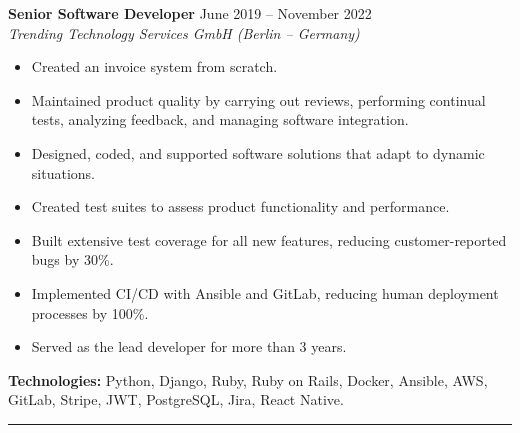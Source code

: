 \textbf{Senior Software Developer} \hfill June 2019 -- November 2022\\
\textit{Trending Technology Services GmbH (Berlin – Germany)}\\
\begin{itemize}
    \setlength{\itemsep}{0pt} %
    \setlength{\topsep}{0pt}  %
    \setlength{\parsep}{0pt}  %
    \setlength{\partopsep}{0pt} %
    \item Created an invoice system from scratch.
    \item Maintained product quality by carrying out reviews, performing continual tests, analyzing feedback, and managing software integration.
    \item Designed, coded, and supported software solutions that adapt to dynamic situations.
    \item Created test suites to assess product functionality and performance.
    \item Built extensive test coverage for all new features, reducing customer-reported bugs by 30\%.
    \item Implemented CI/CD with Ansible and GitLab, reducing human deployment processes by 100\%.
    \item Served as the lead developer for more than 3 years.
\end{itemize}
\textbf{Technologies:} Python, Django, Ruby, Ruby on Rails, Docker, Ansible, AWS, GitLab, Stripe, JWT, PostgreSQL, Jira, React Native.
\hrule
\vspace{1em}

